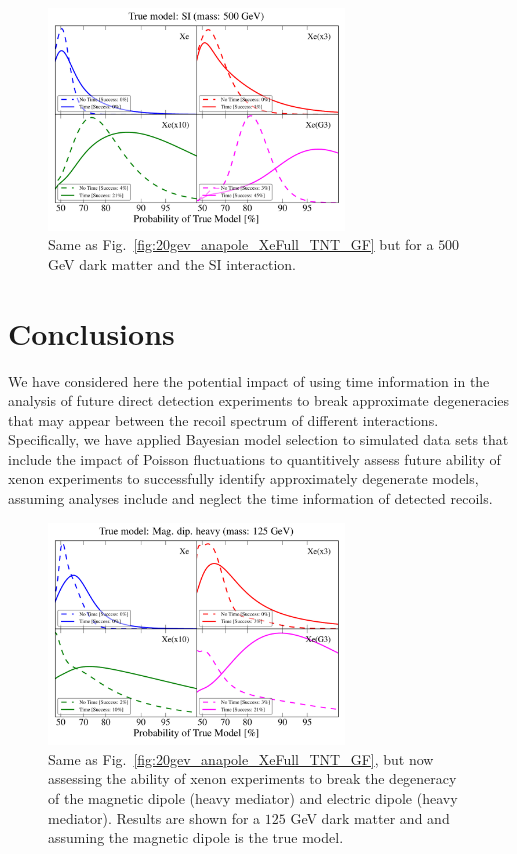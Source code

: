 \documentclass[11pt]{article}
\begin{document}
\begin{figure}
\centering
\includegraphics[width=0.7\textwidth]{plots/PDF_500GeV_SI_Higgs_50sims_Xe_Xe3x_Xe10x_XeG3_GF_TNT.pdf}
\caption{\label{fig:500gev_SI_Higgs_XeFull_TNT_GF}
Same as Fig.~\ref{fig:20gev_anapole_XeFull_TNT_GF} but for a $500$ GeV dark matter and the SI interaction.}
\end{figure}




\section{Conclusions}\label{sec:conclusion}
We have considered here the potential impact of using time information in the analysis of future direct detection experiments to break approximate degeneracies that may appear between the recoil spectrum of different interactions. Specifically, we have applied Bayesian model selection to simulated data sets that include the impact of Poisson fluctuations to quantitively assess future ability of xenon experiments to successfully identify approximately degenerate models, assuming analyses include and neglect the time information of detected recoils.

 
 \begin{figure}
\centering
\includegraphics[width=0.7\textwidth]{plots/PDF_125GeV_Magdipheavy_50sims_Xe_Xe3x_Xe10x_XeG3_GF_TNT.pdf}
\caption{\label{fig:125gev_Mag.dip.heavy_XeFull_TNT_GF}
Same as Fig.~\ref{fig:20gev_anapole_XeFull_TNT_GF}, but now assessing the ability of xenon experiments to break the degeneracy of the magnetic dipole (heavy mediator) and electric dipole (heavy mediator). Results are shown for a $125$ GeV dark matter and and assuming the magnetic dipole is the true model.}
\end{figure}
\end{document}

